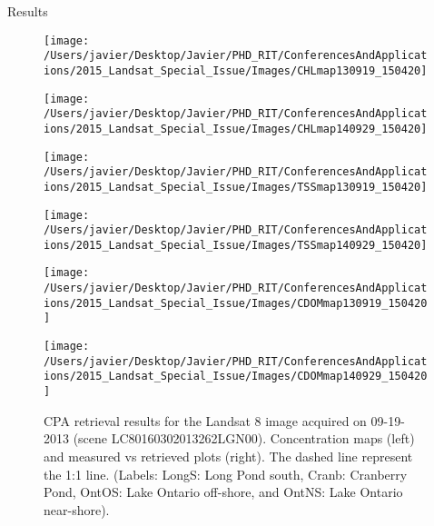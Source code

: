 \documentclass[mathserif]{beamer}
\begin{document}
\begin{frame}{}
\begin{columns}[t]
\begin{column}{.3\linewidth}
\begin{block}{Results}
\begin{figure}[htbp!]
  \begin{minipage}[c]{0.4\linewidth}
      \centering
      \texttt{[image: /Users/javier/Desktop/Javier/PHD\_RIT/ConferencesAndApplications/2015\_Landsat\_Special\_Issue/Images/CHLmap130919\_150420]}  
  \end{minipage}
  \hspace{1cm}
  \begin{minipage}[c]{0.4\linewidth}
      \centering
      \texttt{[image: /Users/javier/Desktop/Javier/PHD\_RIT/ConferencesAndApplications/2015\_Landsat\_Special\_Issue/Images/CHLmap140929\_150420]}  
  \end{minipage}
% 
  \begin{minipage}[c]{0.4\linewidth}
      \centering
      \texttt{[image: /Users/javier/Desktop/Javier/PHD\_RIT/ConferencesAndApplications/2015\_Landsat\_Special\_Issue/Images/TSSmap130919\_150420]}  
  \end{minipage}
  \hspace{1cm}
  \begin{minipage}[c]{0.4\linewidth}
      \centering
      \texttt{[image: /Users/javier/Desktop/Javier/PHD\_RIT/ConferencesAndApplications/2015\_Landsat\_Special\_Issue/Images/TSSmap140929\_150420]}  
  \end{minipage}

  \begin{minipage}[c]{0.4\linewidth}
      \centering
      \texttt{[image: /Users/javier/Desktop/Javier/PHD\_RIT/ConferencesAndApplications/2015\_Landsat\_Special\_Issue/Images/CDOMmap130919\_150420]}  
  \end{minipage}
  \hspace{1cm}
  \begin{minipage}[c]{0.4\linewidth}
      \centering
      \texttt{[image: /Users/javier/Desktop/Javier/PHD\_RIT/ConferencesAndApplications/2015\_Landsat\_Special\_Issue/Images/CDOMmap140929\_150420]}  
  \end{minipage}
% 
  \caption{CPA retrieval results for the Landsat 8 image acquired on 09-19-2013 (scene LC80160302013262LGN00). Concentration maps (left) and measured vs retrieved plots (right). The dashed line represent the 1:1 line. (Labels: LongS: Long Pond south, Cranb: Cranberry Pond, OntOS: Lake Ontario off-shore, and OntNS: Lake Ontario near-shore). \label{fig:CPAsMaps130919} } 
\end{figure}



\end{block}
\end{column}
\end{columns}
\end{frame}
\end{document}
